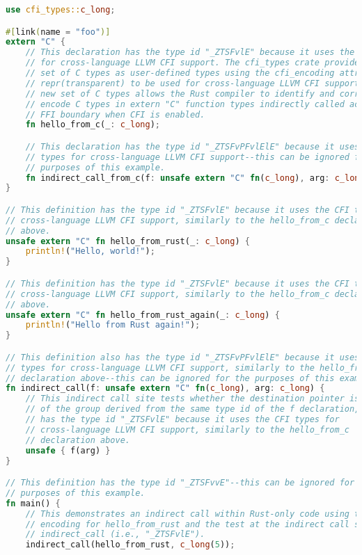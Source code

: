\documentclass{article}
\begin{document}
\begin{lstlisting}[language=Rust, caption={Example Rust program using Rust integer types and the Rust compiler encoding with the cfi\_types crate types.}]
use cfi_types::c_long;

#[link(name = "foo")]
extern "C" {
    // This declaration has the type id "_ZTSFvlE" because it uses the CFI types
    // for cross-language LLVM CFI support. The cfi_types crate provides a new
    // set of C types as user-defined types using the cfi_encoding attribute and
    // repr(transparent) to be used for cross-language LLVM CFI support. This
    // new set of C types allows the Rust compiler to identify and correctly
    // encode C types in extern "C" function types indirectly called across the
    // FFI boundary when CFI is enabled.
    fn hello_from_c(_: c_long);

    // This declaration has the type id "_ZTSFvPFvlElE" because it uses the CFI
    // types for cross-language LLVM CFI support--this can be ignored for the
    // purposes of this example.
    fn indirect_call_from_c(f: unsafe extern "C" fn(c_long), arg: c_long);
}

// This definition has the type id "_ZTSFvlE" because it uses the CFI types for
// cross-language LLVM CFI support, similarly to the hello_from_c declaration
// above.
unsafe extern "C" fn hello_from_rust(_: c_long) {
    println!("Hello, world!");
}

// This definition has the type id "_ZTSFvlE" because it uses the CFI types for
// cross-language LLVM CFI support, similarly to the hello_from_c declaration
// above.
unsafe extern "C" fn hello_from_rust_again(_: c_long) {
    println!("Hello from Rust again!");
}

// This definition also has the type id "_ZTSFvPFvlElE" because it uses the CFI
// types for cross-language LLVM CFI support, similarly to the hello_from_c
// declaration above--this can be ignored for the purposes of this example.
fn indirect_call(f: unsafe extern "C" fn(c_long), arg: c_long) {
    // This indirect call site tests whether the destination pointer is a member
    // of the group derived from the same type id of the f declaration, which
    // has the type id "_ZTSFvlE" because it uses the CFI types for
    // cross-language LLVM CFI support, similarly to the hello_from_c
    // declaration above.
    unsafe { f(arg) }
}

// This definition has the type id "_ZTSFvvE"--this can be ignored for the
// purposes of this example.
fn main() {
    // This demonstrates an indirect call within Rust-only code using the same
    // encoding for hello_from_rust and the test at the indirect call site at
    // indirect_call (i.e., "_ZTSFvlE").
    indirect_call(hello_from_rust, c_long(5));


\end{lstlisting}
\end{document}
